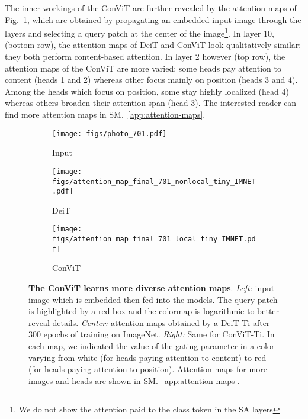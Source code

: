 The inner workings of the ConViT are further revealed by the attention maps of Fig.~\ref{fig:maps-final}, which are obtained by propagating an embedded input image through the layers and selecting a query patch at the center of the image\footnote{We do not show the attention paid to the class token in the SA layers}. In layer 10, (bottom row), the attention maps of DeiT and ConViT look qualitatively similar: they both perform content-based attention. In layer 2 however (top row), the attention maps of the ConViT are more varied: some heads pay attention to content (heads 1 and 2) whereas other focus mainly on position (heads 3 and 4). Among the heads which focus on position, some stay highly localized (head 4) whereas others broaden their attention span (head 3). The interested reader can find more attention maps in SM.~\ref{app:attention-maps}.

\begin{figure}[h!]
    \centering
    \hspace{-1em}
    \begin{subfigure}[b]{.33\columnwidth}
    \texttt{[image: figs/photo\_701.pdf]}
    \caption{Input}
    \end{subfigure}   
    \hspace{-1.3em}
    \begin{subfigure}[b]{.68\columnwidth}
    \texttt{[image: figs/attention\_map\_final\_701\_nonlocal\_tiny\_IMNET.pdf]}
    \caption{DeiT}
    \end{subfigure}
    \par\bigskip
    \begin{subfigure}[b]{.95\columnwidth}
    \texttt{[image: figs/attention\_map\_final\_701\_local\_tiny\_IMNET.pdf]}
    \caption{ConViT}
    \end{subfigure}
    \caption{\textbf{The ConViT learns more diverse attention maps}. \textit{Left:} input image which is embedded then fed into the models. The query patch is highlighted by a red box and the colormap is logarithmic to better reveal details. \textit{Center:} attention maps obtained by a DeiT-Ti after 300 epochs of training on ImageNet. \textit{Right:} Same for ConViT-Ti. In each map, we indicated the value of the gating parameter in a color varying from white (for heads paying attention to content) to red (for heads paying attention to position). Attention maps for more images and heads are shown in SM.~\ref{app:attention-maps}.}
    \label{fig:maps-final}
\end{figure}


